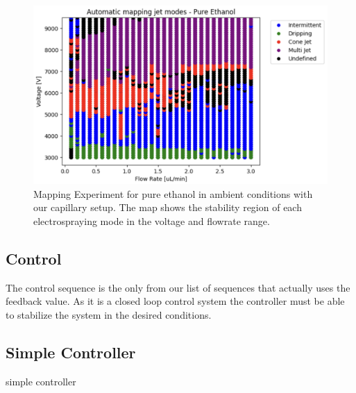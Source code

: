     \begin{figure}[H]
        \center
        \includegraphics[width=15cm]{Figuras/report4/map-2023-03-02.png}
        \caption{Mapping Experiment for pure ethanol in ambient conditions with our capillary setup. The map shows the stability region of each electrospraying mode in the voltage and flowrate range.}
        \label{fig:map3Data_fig}
    \end{figure}



\subsection{Control}

    The control sequence is the only from our list of sequences that actually uses the feedback value. 
    As it is a closed loop control system the controller must be able to stabilize the system in the desired conditions.


    \subsection{Simple Controller}

        \begin{algorithm}
            \caption{simple controller}\label{alg:simple_controller}
            \begin{algorithmic}
                
                    \State {}
                    \State {}
                \EndIf

            \EndFunction
            \end{algorithmic}
        \end{algorithm}




\clearpage